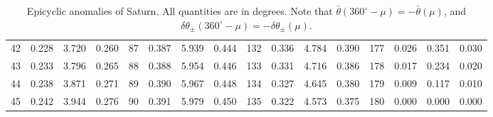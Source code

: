 \begin{table}[!h]
{\begin{tabular}{rrrr|rrrr|rrrr|rrrr}
 42 & \tiny{  0.228} &   3.720 & \tiny{  0.260} &  87 & \tiny{  0.387} &   5.939 & \tiny{  0.444} & 132 & \tiny{  0.336} &   4.784 & \tiny{  0.390} & 177 & \tiny{  0.026} &   0.351 & \tiny{  0.030}\\
 43 & \tiny{  0.233} &   3.796 & \tiny{  0.265} &  88 & \tiny{  0.388} &   5.954 & \tiny{  0.446} & 133 & \tiny{  0.331} &   4.716 & \tiny{  0.386} & 178 & \tiny{  0.017} &   0.234 & \tiny{  0.020}\\
 44 & \tiny{  0.238} &   3.871 & \tiny{  0.271} &  89 & \tiny{  0.390} &   5.967 & \tiny{  0.448} & 134 & \tiny{  0.327} &   4.645 & \tiny{  0.380} & 179 & \tiny{  0.009} &   0.117 & \tiny{  0.010}\\
 45 & \tiny{  0.242} &   3.944 & \tiny{  0.276} &  90 & \tiny{  0.391} &   5.979 & \tiny{  0.450} & 135 & \tiny{  0.322} &   4.573 & \tiny{  0.375} & 180 & \tiny{  0.000} &   0.000 & \tiny{  0.000}\\
\end{tabular}}
\caption{Epicyclic anomalies of Saturn. All quantities are in degrees. Note that $\bar{\theta}(360^\circ-\mu) = -\bar{\theta}(\mu)$, and $\delta\theta_{\pm}(360^\circ-\mu) = -\delta\theta_{\pm}(\mu)$. }\label{vt16}
\end{table}

